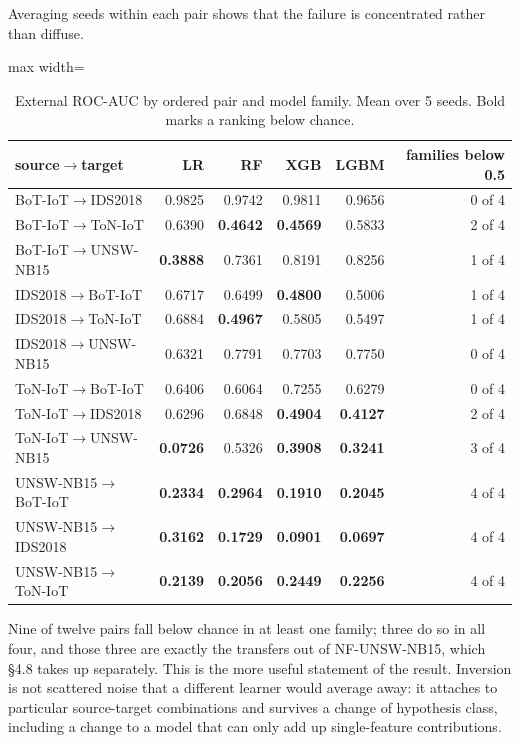 \documentclass[preprint,12pt]{elsarticle}
\begin{document}
Averaging seeds within each pair shows that the failure is concentrated rather than diffuse.

\begin{table}[htbp]\centering\scriptsize
\caption{External ROC-AUC by ordered pair and model family. Mean over 5 seeds. Bold marks a ranking below chance.}
\begin{adjustbox}{max width=\textwidth}\begin{tabular}{lrrrrr}
\toprule
source$\rightarrow$target & LR & RF & XGB & LGBM & families below 0.5 \\
\midrule
BoT-IoT$\rightarrow$IDS2018 & 0.9825 & 0.9742 & 0.9811 & 0.9656 & 0 of 4 \\
BoT-IoT$\rightarrow$ToN-IoT & 0.6390 & \textbf{0.4642} & \textbf{0.4569} & 0.5833 & 2 of 4 \\
BoT-IoT$\rightarrow$UNSW-NB15 & \textbf{0.3888} & 0.7361 & 0.8191 & 0.8256 & 1 of 4 \\
IDS2018$\rightarrow$BoT-IoT & 0.6717 & 0.6499 & \textbf{0.4800} & 0.5006 & 1 of 4 \\
IDS2018$\rightarrow$ToN-IoT & 0.6884 & \textbf{0.4967} & 0.5805 & 0.5497 & 1 of 4 \\
IDS2018$\rightarrow$UNSW-NB15 & 0.6321 & 0.7791 & 0.7703 & 0.7750 & 0 of 4 \\
ToN-IoT$\rightarrow$BoT-IoT & 0.6406 & 0.6064 & 0.7255 & 0.6279 & 0 of 4 \\
ToN-IoT$\rightarrow$IDS2018 & 0.6296 & 0.6848 & \textbf{0.4904} & \textbf{0.4127} & 2 of 4 \\
ToN-IoT$\rightarrow$UNSW-NB15 & \textbf{0.0726} & 0.5326 & \textbf{0.3908} & \textbf{0.3241} & 3 of 4 \\
UNSW-NB15$\rightarrow$BoT-IoT & \textbf{0.2334} & \textbf{0.2964} & \textbf{0.1910} & \textbf{0.2045} & 4 of 4 \\
UNSW-NB15$\rightarrow$IDS2018 & \textbf{0.3162} & \textbf{0.1729} & \textbf{0.0901} & \textbf{0.0697} & 4 of 4 \\
UNSW-NB15$\rightarrow$ToN-IoT & \textbf{0.2139} & \textbf{0.2056} & \textbf{0.2449} & \textbf{0.2256} & 4 of 4 \\
\bottomrule
\end{tabular}\end{adjustbox}
\end{table}

Nine of twelve pairs fall below chance in at least one family; three do so in all four, and those three are exactly the transfers out of NF-UNSW-NB15, which \S{}4.8 takes up separately. This is the more useful statement of the result. Inversion is not scattered noise that a different learner would average away: it attaches to particular source-target combinations and survives a change of hypothesis class, including a change to a model that can only add up single-feature contributions.
\end{document}
